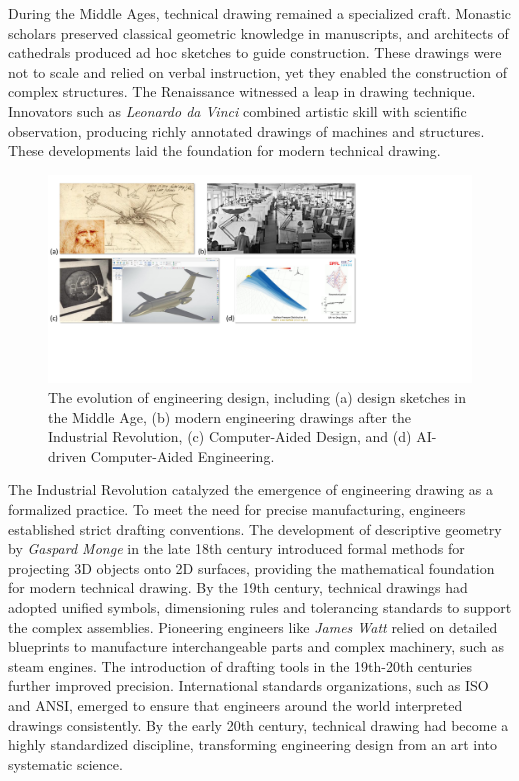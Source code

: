 During the Middle Ages, technical drawing remained a specialized craft. Monastic scholars preserved classical geometric knowledge in manuscripts, and architects of cathedrals produced ad hoc sketches to guide construction. These drawings were not to scale and relied on verbal instruction, yet they enabled the construction of complex structures. The Renaissance witnessed a leap in drawing technique. Innovators such as \textit{Leonardo da Vinci} combined artistic skill with scientific observation, producing richly annotated drawings of machines and structures. These developments laid the foundation for modern technical drawing.

\begin{figure}[!tbh]
    \begin{center}
        \includegraphics[width=1\linewidth]{chapter2/fig/history.pdf}
    \end{center}
    \vspace{-3mm}
    \caption{
        \small The evolution of engineering design, including (a) design sketches in the Middle Age, (b) modern engineering drawings after the Industrial Revolution, (c) Computer-Aided Design, and (d) AI-driven Computer-Aided Engineering.
    }
    \label{ch2:fig:history}
\end{figure}

The Industrial Revolution catalyzed the emergence of engineering drawing as a formalized practice. To meet the need for precise manufacturing, engineers established strict drafting conventions. The development of descriptive geometry by \textit{Gaspard Monge} in the late 18th century introduced formal methods for projecting 3D objects onto 2D surfaces, providing the mathematical foundation for modern technical drawing.  By the 19th century, technical drawings had adopted unified symbols, dimensioning rules and tolerancing standards to support the complex assemblies. Pioneering engineers like \textit{James Watt} relied on detailed blueprints to manufacture interchangeable parts and complex machinery, such as steam engines. The introduction of drafting tools in the 19th-20th centuries further improved precision. International standards organizations, such as ISO and ANSI, emerged to ensure that engineers around the world interpreted drawings consistently. By the early 20th century, technical drawing had become a highly standardized discipline, transforming engineering design from an art into systematic science.

